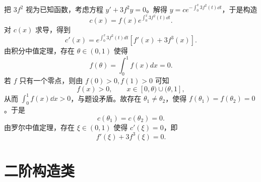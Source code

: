\begin{solution}
把 \(3f^2\) 视为已知函数，考虑方程 \(y'+3f^2y=0\)。解得 \(y=ce^{-\int_0^x3f^2(t)\dd t}\)，于是构造
\[
c\left(x\right)=f\left(x\right)e^{\int_0^x3f^2(t)\dd t}.
\]
对 $c(x)$ 求导，得到
$$c'\left(x\right)=e^{\int_0^x3f^2\left(t\right)dt}\left[f'\left(x\right)+3f^3\left(x\right)\right].$$
由积分中值定理，存在 $\theta\in(0,1)$ 使得
$$f\left(\theta\right)=\int_0^1f\left(x\right)dx=0.$$
若 \(f\) 只有一个零点，则由 \(f\left(0\right)>0,f\left(1\right)>0\) 可知
\[
f\left(x\right)>0,\qquad x\in[0,\theta)\cup(\theta,1],
\]
从而 \(\int_0^1f\left(x\right)\dd x>0\)，与题设矛盾。故存在 $\theta_1\neq\theta_2$，使得 $f\left(\theta_1\right)=f\left(\theta_2\right)=0$。于是
\[
c\left(\theta_1\right)=c\left(\theta_2\right)=0.
\]
由罗尔中值定理，存在 $\xi\in\left(0,1\right)$ 使得 $c'(\xi)=0$，即
$$f'\left(\xi\right)+3f^3\left(\xi\right)=0.$$
\end{solution}
\section{二阶构造类}
